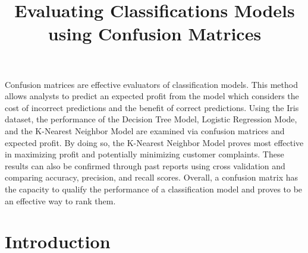 \documentclass[journal]{IEEEtran}
\begin{document}
\setlength{\emergencystretch}{12pt}
\setlength{\parindent}{10pt}



\lstset{style=mystyle}

\title{Evaluating Classifications Models using Confusion Matrices}

\author{
}

\maketitle

\begin{abstract}
\label{log:abstract}
\end{abstract}
Confusion matrices are effective evaluators of classification models. This method allows analysts to predict an expected profit from the model which considers the cost of incorrect predictions and the benefit of correct predictions. Using the Iris dataset, the performance of the Decision Tree Model, Logistic Regression Mode, and the K-Nearest Neighbor Model are examined via confusion matrices and expected profit. By doing so, the K-Nearest Neighbor Model proves most effective in maximizing profit and potentially minimizing customer complaints. These results can also be confirmed through past reports using cross validation and comparing accuracy, precision, and recall scores. Overall, a confusion matrix has the capacity to qualify the performance of a classification model and proves to be an effective way to rank them. 

\section{Introduction}
\end{document}
